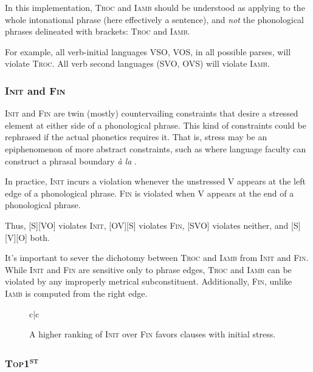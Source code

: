 \documentclass{article}
\newcommand{\iamb}{\textsc{Iamb}}
\newcommand{\topf}{\textsc{Top1\textsuperscript{st}}}
\newcommand{\finphi}{\textsc{Fin\textphi}}
\newcommand{\initphi}{\textsc{Init\textphi}}
\newcommand{\troc}{\textsc{Troc}}
\begin{document}
In this implementation, {\troc} and {\iamb} should be understood as applying to the whole intonational phrase (here effectively a sentence), and \emph{not} the phonological phrases delineated with brackets: {\troc} and {\iamb}.

For example, all verb-initial languages VSO, VOS, in all possible parses, will violate {\troc}.
All verb second languages (SVO, OVS) will violate {\iamb}.

\subsubsection{{\initphi} and {\finphi}}

{\initphi} and {\finphi} are twin (mostly) countervailing constraints that desire a stressed element at either side of a phonological phrase.
This kind of constraints could be rephrased if the actual phonetics requires it.
That is, stress may be an epiphenomenon of more abstract constraints, such as where language faculty can construct a phrasal boundary \textit{\`a la} \textcite{richards10}.

In practice, {\initphi} incurs a violation whenever the unstressed V appears at the left edge of a phonological phrase.
{\finphi} is violated when V appears at the end of a phonological phrase.

Thus, [S][VO] violates {\initphi}, [OV][S] violates {\finphi}, [SVO] violates neither, and [S][V][O] both.

It's important to sever the dichotomy between {\troc} and {\iamb} from {\initphi} and {\finphi}. While {\initphi} and {\finphi} are sensitive only to phrase edges, {\troc} and {\iamb} can be violated by any improperly metrical subconstituent. Additionally, {\finphi}, unlike {\iamb} is computed from the right edge.


\begin{figure}
\begin{center}
\begin{tableau}{c|c}
		\const{\initphi}	\const{\finphi}
	\cand[\Optimal]{[OV]} \vio{}	\vio{*}
	\cand{[VO]} \vio{*!}	\vio{}
\end{tableau}
\end{center}
	\caption{A higher ranking of {\initphi} over {\finphi} favors clauses with initial stress.}
\end{figure}

\subsubsection{\topf}
\end{document}
